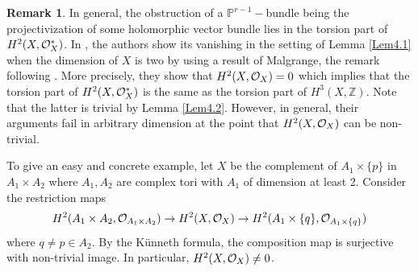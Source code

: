 \documentclass[a4, 12pt]{amsart}
\numberwithin{equation}{section}
\theoremstyle{definition}
\newtheorem{rem}[thm]{Remark}
\def\Z{\mathbb{Z}}
\def\P{\mathbb{P}}
\def\P{\mathbb{P}}
\begin{document}
\begin{rem}
In general, the obstruction of a $\P^{r-1}-$bundle being the projectivization of some holomorphic vector bundle lies in the torsion part of $H^2(X, \mathcal{O}_X^*)$.
In \cite{PS98}, the authors show its vanishing in the setting of Lemma \ref{Lem4.1} when the dimension of $X$ is two by using a result of Malgrange, the remark following \cite[Thm. 8]{Mal55}.
 More precisely, they show that  $H^2(X, \mathcal{O}_X)=0$ which implies that  the torsion part of $H^2(X, \mathcal{O}_X^*)$ is the same as  the torsion part of $H^3(X, \Z)$.
 Note that the latter is trivial by Lemma \ref{Lem4.2}.
 However, in general, their arguments fail in arbitrary dimension at the point that
 $H^2(X, \mathcal{O}_X)$ can be non-trivial.

 To give an easy and concrete example, let $X$ be the complement of $A_1 \times \{p\}$ in $A_1 \times A_2$ where $A_1,A_2$ are complex tori with $A_1$ of dimension at least 2.
 Consider the restriction maps
 $$H^{2}(A_1 \times A_2, \mathcal{O}_{A_1 \times A_2})  \to H^2(X,\mathcal{O}_X) \to H^2(A_1 \times \{q\},\mathcal{O}_{A_1 \times \{q\}}) $$
 where $q \neq p \in A_2$.
By the K\"unneth formula, the composition map is surjective with non-trivial image.
In particular, $H^2(X, \mathcal{O}_X) \neq 0$.
\end{rem}
\end{document}
